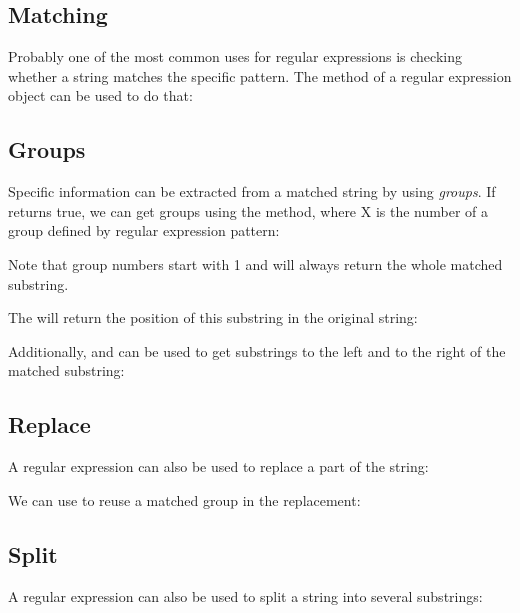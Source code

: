 \subsection{Matching}
\label{std-regex-match}

Probably one of the most common uses for regular expressions is checking whether a string matches the specific pattern. The  method of a regular expression object can be used to do that:

\subsection{Groups}
\label{std-regex-groups}

Specific information can be extracted from a matched string by using \emph{groups}. If  returns true, we can get groups using the  method, where X is the number of a group defined by regular expression pattern:


Note that group numbers start with 1 and  will always return the whole matched substring.

The  will return the position of this substring in the original string:


Additionally,  and  can be used to get substrings to the left and to the right of the matched substring:


\subsection{Replace}
\label{std-regex-replace}

A regular expression can also be used to replace a part of the string:


We can use  to reuse a matched group in the replacement:


\subsection{Split}
\label{std-regex-split}

A regular expression can also be used to split a string into several substrings:

